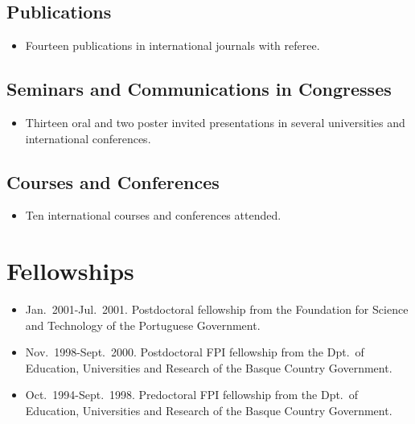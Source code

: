 \documentclass{article}
\begin{document}

\subsection*{Publications}

\begin{itemize}\itemsep 0pt
\item Fourteen publications in international journals with referee.
\end{itemize}


\subsection*{Seminars and Communications in Congresses}

\begin{itemize}\itemsep 0pt
\item Thirteen oral and two poster invited presentations 
in several universities and international conferences.
\end{itemize}


\subsection*{Courses and Conferences}

\begin{itemize}\itemsep 0pt
\item Ten international courses and conferences attended.
\end{itemize}



\section*{Fellowships}

\begin{itemize}\itemsep 0pt
\item Jan.~2001-Jul.~2001.
Postdoctoral fellowship from the Foundation for Science and
Technology of the Portuguese Government.

\item Nov.~1998-Sept.~2000.
Postdoctoral FPI fellowship from the Dpt.\ of Education,
Universities and Research of the Basque Country Government.

\item Oct.~1994-Sept.~1998.
Predoctoral FPI fellowship from the Dpt.\ of Education,
Universities and Research of the Basque Country Government.
\end{itemize}
\end{document}

